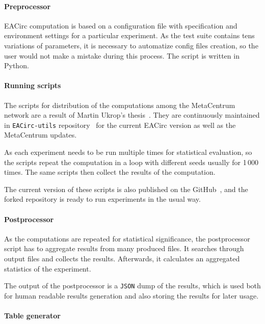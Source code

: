 \documentclass[
    digital,    %
    oneside,    %
    color,
    11pt,
    nocover,
    notable,
    nolof,
    nolot,
]{fithesis3}
\begin{document}
\paragraph{Preprocessor}

EACirc computation is based on a configuration file with specification and environment settings for a particular experiment. As the test suite contains tens variations of parameters, it is necessary to automatize config files creation, so the user would not make a mistake during this process. The script is written in Python.

\paragraph{Running scripts}

The scripts for distribution of the computations among the MetaCentrum network are a result of Martin Ukrop's thesis~\cite{ukropMgrThesis}. They are continuously maintained in \texttt{EACirc-utils} repository~\cite{eaUtils} for the current EACirc version as well as the MetaCentrum updates.

As each experiment needs to be run multiple times for statistical evaluation, so the scripts repeat the computation in a loop with different seeds usually for 1\,000 times. The same scripts then collect the results of the computation.

The current version of these scripts is also published on the GitHub~\cite{eaUtils}, and the forked repository is ready to run experiments in the usual way.

\paragraph{Postprocessor}

As the computations are repeated for statistical significance, the postprocessor script has to aggregate results from many produced files. It searches through output files and collects the results. Afterwards, it calculates an aggregated statistics of the experiment.

The output of the postprocessor is a \texttt{JSON} dump of the results, which is used both for human readable results generation and also storing the results for later usage.

\paragraph{Table generator}
\end{document}
